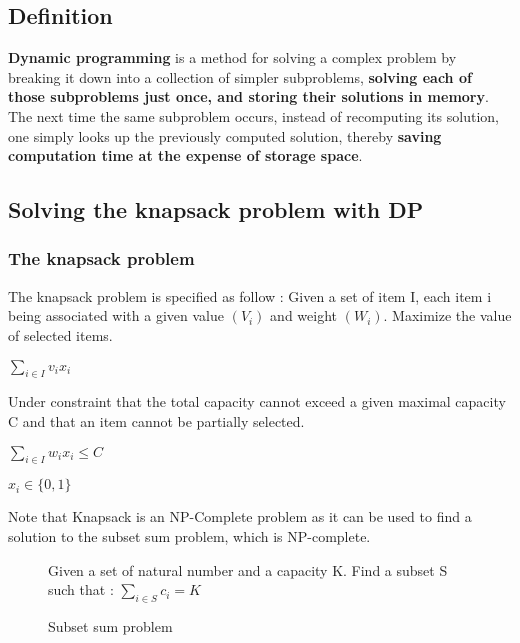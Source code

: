 
\subsection{Definition}

\textbf{Dynamic programming} is a method for solving a complex problem by breaking it down 
into a collection of simpler subproblems, \textbf{solving each of those subproblems just once, 
and storing their solutions in memory}. The next time the same subproblem occurs, instead of 
recomputing its solution, one simply looks up the previously computed solution, thereby 
\textbf{saving computation time at the expense of storage space}.

\subsection{Solving the knapsack problem with DP}

\subsubsection{The knapsack problem}

The knapsack problem is specified as follow : Given a set of item I, each item i being 
associated with a given value $(V_i)$ and weight $(W_i)$. Maximize the value of 
selected items. 

\begin{center}
\Large{$\sum_{i \in I} v_i x_i$}
\end{center}

Under constraint that the total capacity cannot exceed a given maximal capacity C 
and that an item cannot be partially selected. \newline

\begin{center}
\Large{$\sum_{i \in I} w_i x_i \le C$}

\vspace{3 mm}
\Large{$x_i \in \{0,1\}$}
\end{center}

Note that Knapsack is an NP-Complete problem as it can be used
to find a solution to the subset sum problem, which is NP-complete.

\begin{figure}[!ht]
	\centering
	\begin{framed}
	Given a set of natural number and a capacity K. 
	Find a subset S such that :\newline
	\Large{$\sum_{i \in S} c_i = K$}
	\end{framed}
	\caption{Subset sum problem}
\end{figure}
\FloatBarrier

